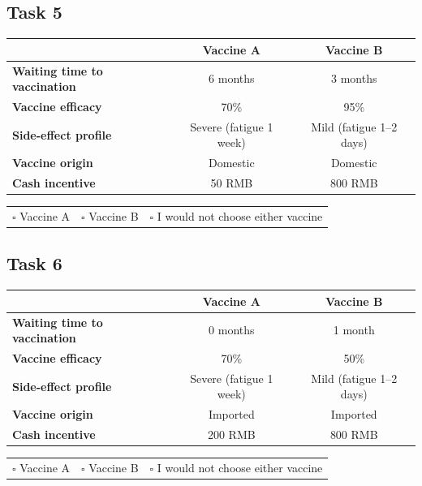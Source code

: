 \documentclass[12pt]{article}
\begin{document}
\subsection*{Task 5}

\begin{center}
\small
\begin{tabular}{@{}p{5cm}cc@{}}
    \toprule
    & \textbf{Vaccine A} & \textbf{Vaccine B} \\
    \midrule
    \textbf{Waiting time to vaccination} & 6 months & 3 months \\
    \textbf{Vaccine efficacy} & 70\% & 95\% \\
    \textbf{Side-effect profile} & Severe (fatigue 1 week) & Mild (fatigue 1--2 days) \\
    \textbf{Vaccine origin} & Domestic & Domestic \\
    \textbf{Cash incentive} & 50 RMB & 800 RMB \\
    \bottomrule
\end{tabular}

\vspace{1em}
\begin{tabular}{@{}ccc@{}}
    $\square$ Vaccine A & $\square$ Vaccine B & $\square$ I would not choose either vaccine \\
\end{tabular}
\end{center}

\subsection*{Task 6}

\begin{center}
\small
\begin{tabular}{@{}p{5cm}cc@{}}
    \toprule
    & \textbf{Vaccine A} & \textbf{Vaccine B} \\
    \midrule
    \textbf{Waiting time to vaccination} & 0 months & 1 month \\
    \textbf{Vaccine efficacy} & 70\% & 50\% \\
    \textbf{Side-effect profile} & Severe (fatigue 1 week) & Mild (fatigue 1--2 days) \\
    \textbf{Vaccine origin} & Imported & Imported \\
    \textbf{Cash incentive} & 200 RMB & 800 RMB \\
    \bottomrule
\end{tabular}

\vspace{1em}
\begin{tabular}{@{}ccc@{}}
    $\square$ Vaccine A & $\square$ Vaccine B & $\square$ I would not choose either vaccine \\
\end{tabular}
\end{center}
\end{document}
